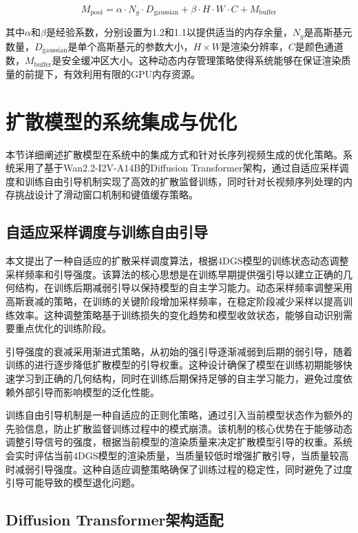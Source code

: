 \begin{equation}
M_{\text{pool}} = \alpha \cdot N_g \cdot D_{\text{gaussian}} + \beta \cdot H \cdot W \cdot C + M_{\text{buffer}}
\label{eq:memory_pool_sizing}
\end{equation}

其中$\alpha$和$\beta$是经验系数，分别设置为1.2和1.1以提供适当的内存余量，$N_g$是高斯基元数量，$D_{\text{gaussian}}$是单个高斯基元的参数大小，$H \times W$是渲染分辨率，$C$是颜色通道数，$M_{\text{buffer}}$是安全缓冲区大小。这种动态内存管理策略使得系统能够在保证渲染质量的前提下，有效利用有限的GPU内存资源。

\section{扩散模型的系统集成与优化}

本节详细阐述扩散模型在系统中的集成方式和针对长序列视频生成的优化策略。系统采用了基于Wan2.2-I2V-A14B的Diffusion Transformer架构，通过自适应采样调度和训练自由引导机制实现了高效的扩散监督训练，同时针对长视频序列处理的内存挑战设计了滑动窗口机制和键值缓存策略。

\subsection{自适应采样调度与训练自由引导}

本文提出了一种自适应的扩散采样调度算法，根据4DGS模型的训练状态动态调整采样频率和引导强度。该算法的核心思想是在训练早期提供强引导以建立正确的几何结构，在训练后期减弱引导以保持模型的自主学习能力。动态采样频率调整采用高斯衰减的策略，在训练的关键阶段增加采样频率，在稳定阶段减少采样以提高训练效率。这种调整策略基于训练损失的变化趋势和模型收敛状态，能够自动识别需要重点优化的训练阶段。

引导强度的衰减采用渐进式策略，从初始的强引导逐渐减弱到后期的弱引导，随着训练的进行逐步降低扩散模型的引导权重。这种设计确保了模型在训练初期能够快速学习到正确的几何结构，同时在训练后期保持足够的自主学习能力，避免过度依赖外部引导而影响模型的泛化性能。

训练自由引导机制是一种自适应的正则化策略，通过引入当前模型状态作为额外的先验信息，防止扩散监督训练过程中的模式崩溃。该机制的核心优势在于能够动态调整引导信号的强度，根据当前模型的渲染质量来决定扩散模型引导的权重。系统会实时评估当前4DGS模型的渲染质量，当质量较低时增强扩散引导，当质量较高时减弱引导强度。这种自适应调整策略确保了训练过程的稳定性，同时避免了过度引导可能导致的模型退化问题。

\subsection{Diffusion Transformer架构适配}

